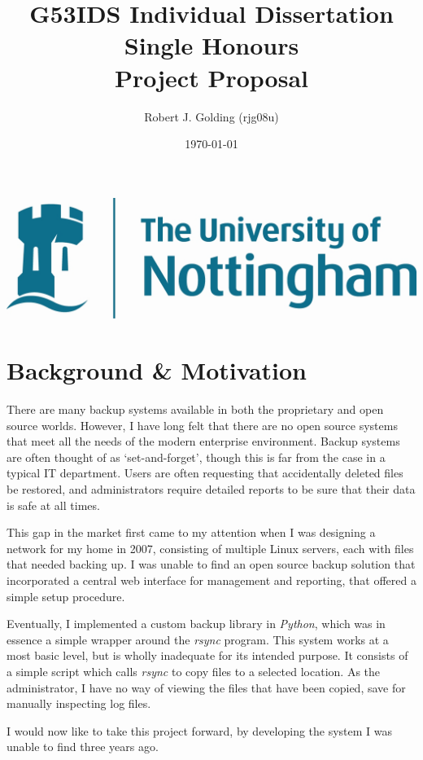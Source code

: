 \documentclass[a4paper]{article}
\title{
    \vspace{3cm}
    \huge{G53IDS Individual Dissertation Single Honours} \\[0.5cm]
    \LARGE{Project Proposal} \\[0.2cm]
}
\author{Robert J. Golding (rjg08u)} \date{\today}
\begin{document}
    \maketitle
    \vspace{10cm}
    \begin{center}
        \includegraphics{notts.jpg}
    \end{center}
    \newpage

    \section{Background \& Motivation}
    There are many backup systems available in both the proprietary and open
    source worlds. However, I have long felt that there are no open source
    systems that meet all the needs of the modern enterprise environment.
    Backup systems are often thought of as `set-and-forget', though this is far
    from the case in a typical IT department. Users are often requesting that
    accidentally deleted files be restored, and administrators require detailed
    reports to be sure that their data is safe at all times.

    This gap in the market first came to my attention when I was designing
    a network for my home in 2007, consisting of multiple Linux servers, each
    with files that needed backing up. I was unable to find an open source
    backup solution that incorporated a central web interface for management
    and reporting, that offered a simple setup procedure.

    Eventually, I implemented a custom backup library in \emph{Python}, which
    was in essence a simple wrapper around the \emph{rsync} program. This
    system works at a most basic level, but is wholly inadequate for its
    intended purpose. It consists of a simple script which calls \emph{rsync}
    to copy files to a selected location. As the administrator, I have no way
    of viewing the files that have been copied, save for manually inspecting
    log files.

    I would now like to take this project forward, by developing the system
    I was unable to find three years ago.
\end{document}
